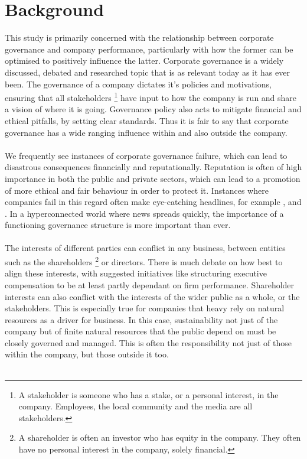 \section{Background}
{This study is primarily concerned with the relationship between corporate governance and company performance, particularly with how the former can be optimised to positively influence the latter. Corporate governance is a widely discussed, debated and researched topic that is as relevant today as it has ever been. The governance of a company dictates it's policies and motivations, ensuring that all stakeholders \footnote{A stakeholder is someone who has a stake, or a personal interest, in the company. Employees, the local community and the media are all stakeholders.} have input to how the company is run and share a vision of where it is going. Governance policy also acts to mitigate financial and ethical pitfalls, by setting clear standards. Thus it is fair to say that corporate governance has a wide ranging influence within and also outside the company.\\\\
We frequently see instances of corporate governance failure, which can lead to disastrous consequences financially and reputationally. Reputation is often of high importance in both the public and private sectors, which can lead to a promotion of more ethical and fair behaviour in order to protect it. Instances where companies fail in this regard often make eye-catching  headlines, for example \cite{cnnUnitedAirlines}, \cite{telegraphVolkswagon} and \cite{kirkpatrick2009corporate}. In a hyperconnected world where news spreads quickly, the importance of a functioning governance structure is more important than ever. \\\\
The interests of different parties can conflict in any business, between entities such as the shareholders \footnote{A shareholder is often an investor who has equity in the company. They often have no personal interest in the company, solely financial.} or directors. There is much debate on how best to align these interests, with suggested initiatives like structuring executive compensation to be at least partly dependant on firm performance. Shareholder interests can also conflict with the interests of the wider public as a whole, or the stakeholders. This is especially true for companies that heavy rely on natural resources as a driver for business. In this case, sustainability not just of the company but of finite natural resources that the public depend on must be closely governed and managed. This is often the responsibility not just of those within the company, but those outside it too.  \\\\
}

